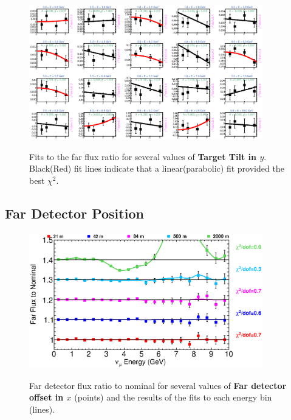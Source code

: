 \begin{figure}[hb]
  \begin{center}
    {\includegraphics[width=4.0in]{figures/TargetYTilt_far_fits.eps}}
  \end{center}
\caption{ Fits to the far flux ratio for several values of {\bf Target Tilt in $y$}. Black(Red) fit lines indicate that a linear(parabolic) fit provided the best $\chi^2$. }
\end{figure}

\clearpage
\subsection{Far Detector Position}

\begin{figure}[ht]
  \begin{center}
    {\includegraphics[width=4.0in]{figures/LBNEFDX_far_summary.eps}}
  \end{center}
\caption{ Far detector flux ratio to nominal for several values of {\bf Far detector offset in $x$} (points) and the results of the fits to each energy bin (lines).}
\end{figure}

